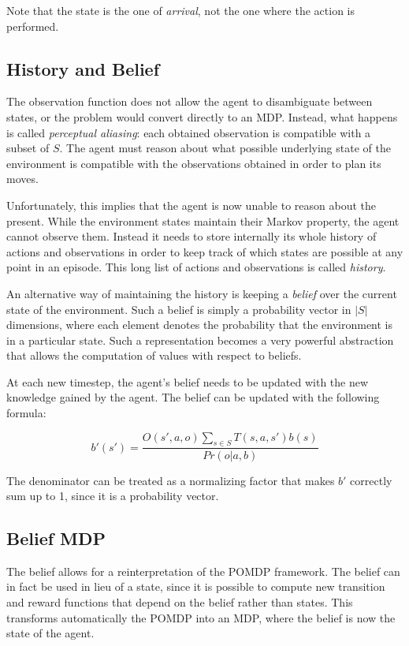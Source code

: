Note that the state is the one of \textit{arrival}, not the one where the action is performed.

\subsection{History and Belief}

The observation function does not allow the agent to disambiguate between states, or the problem
would convert directly to an MDP. Instead, what happens is called \textit{perceptual aliasing}: each
obtained observation is compatible with a subset of $S$. The agent must reason about what possible
underlying state of the environment is compatible with the observations obtained in order to plan
its moves.

Unfortunately, this implies that the agent is now unable to reason about the present. While the
environment states maintain their Markov property, the agent cannot observe them. Instead it needs
to store internally its whole history of actions and observations in order to keep track of which
states are possible at any point in an episode. This long list of actions and observations is called
\textit{history}.

An alternative way of maintaining the history is keeping a \textit{belief} over the current state of
the environment. Such a belief is simply a probability vector in $|S|$ dimensions, where each
element denotes the probability that the environment is in a particular state. Such a representation
becomes a very powerful abstraction that allows the computation of values with respect to beliefs.

At each new timestep, the agent's belief needs to be updated with the new knowledge gained by the
agent. The belief can be updated with the following formula:

\[ b'(s') = \frac{O(s', a, o)\sum_{s\in S}T(s,a,s')b(s)}{Pr(o|a,b)} \]

The denominator can be treated as a normalizing factor that makes $b'$ correctly sum up to 1, since
it is a probability vector.

\subsection{Belief MDP}

The belief allows for a reinterpretation of the POMDP framework. The belief can in fact be used in
lieu of a state, since it is possible to compute new transition and reward functions that depend on
the belief rather than states. This transforms automatically the POMDP into an MDP, where the
belief is now the state of the agent.

